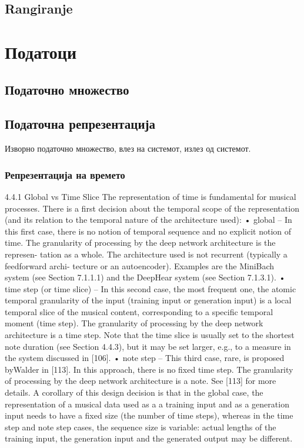\section{Rangiranje}

\cite{GarciaSalas2011}

\chapter{Податоци}

\section{Податочно множество}

\section{Податочна репрезентација }

Изворно податочно множество, влез на системот, излез од системот. 

\subsection{Репрезентација на времето}
4.4.1 Global vs Time Slice
The representation of time is fundamental for musical processes. There is a first decision about the temporal scope of the representation (and its relation to the temporal nature of the architecture used):
• global – In this first case, there is no notion of temporal sequence and no explicit notion of time. The granularity of processing by the deep network architecture is the represen-
tation as a whole. The architecture used is not recurrent (typically a feedforward archi- tecture or an autoencoder). Examples are the MiniBach system (see Section 7.1.1.1) and the DeepHear system (see Section 7.1.3.1).
• time step (or time slice) – In this second case, the most frequent one, the atomic temporal granularity of the input (training input or generation input) is a local temporal slice
of the musical content, corresponding to a specific temporal moment (time step). The granularity of processing by the deep network architecture is a time step. Note that the time slice is usually set to the shortest note duration (see Section 4.4.3), but it may be set larger, e.g., to a measure in the system discussed in [106].
• note step – This third case, rare, is proposed byWalder in [113]. In this approach, there is no fixed time step. The granularity of processing by the deep network architecture is
a note. See [113] for more details. A corollary of this design decision is that in the global case, the representation of a
musical data used as a a training input and as a generation input needs to have a fixed size (the number of time steps), whereas in the time step and note step cases, the sequence size is variable: actual lengths of the training input, the generation input and the generated output may be different.

